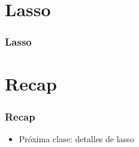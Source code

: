 \documentclass[
  shownotes,
  xcolor={svgnames},
  hyperref={colorlinks,citecolor=DarkBlue,linkcolor=andesred,urlcolor=DarkBlue}
  , aspectratio=169]{beamer}
\begin{document}
\section{Lasso}
\begin{frame}[fragile]
\frametitle{Lasso}
\end{frame}
\section{Recap}
\begin{frame}[fragile]
\frametitle{Recap}

\begin{itemize}


\item Próxima clase: detalles de lasso
 
\end{itemize}
 

 \end{frame}


\end{document}
